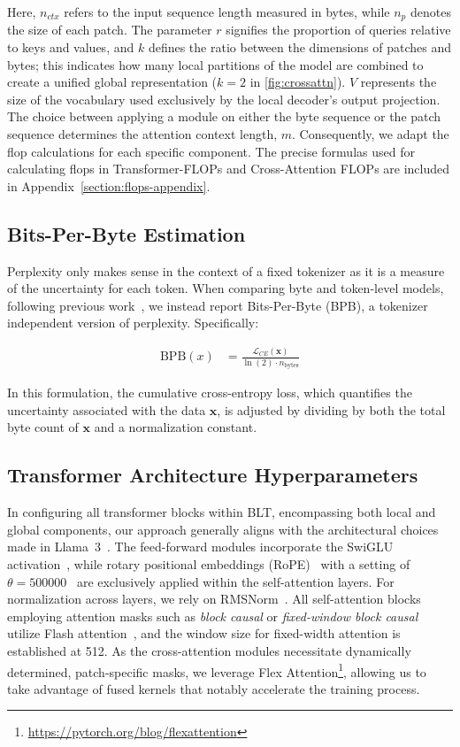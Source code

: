 Here, $n_{ctx}$ refers to the input sequence length measured in bytes, while $n_p$ denotes the size of each patch. The parameter $r$ signifies the proportion of queries relative to keys and values, and $k$ defines the ratio between the dimensions of patches and bytes; this indicates how many local partitions of the model are combined to create a unified global representation ($k=2$ in \autoref{fig:crossattn}). $V$ represents the size of the vocabulary used exclusively by the local decoder’s output projection. The choice between applying a module on either the byte sequence or the patch sequence determines the attention context length, $m$. Consequently, we adapt the flop calculations for each specific component. The precise formulas used for calculating flops in Transformer-FLOPs and Cross-Attention FLOPs are included in Appendix~\ref{section:flops-appendix}.

\subsection{Bits-Per-Byte Estimation} Perplexity only makes sense in the context of a fixed tokenizer as it is a measure of the uncertainty for each token. When comparing byte and token-level models, following previous work~\citep{xue2022byt5, yu2023megabyte, wang2024mambabyte}, we instead report Bits-Per-Byte (BPB), a tokenizer independent version of perplexity. Specifically:

\begin{align}
    \text{BPB}(x)&= \frac{\mathcal{L}_{CE}(\pmb{x})}{\ln(2)\cdot n_{\text{bytes}}}
\end{align}

In this formulation, the cumulative cross-entropy loss, which quantifies the uncertainty associated with the data $\pmb{x}$, is adjusted by dividing by both the total byte count of $\pmb{x}$ and a normalization constant.

\subsection{Transformer Architecture Hyperparameters} In configuring all transformer blocks within {\textsc BLT}, encompassing both local and global components, our approach generally aligns with the architectural choices made in Llama~3~\citep{dubey2024llama}. The feed-forward modules incorporate the SwiGLU activation~\citep{swiglu}, while rotary positional embeddings (RoPE)~\citep{RoPe} with a setting of $\theta=500000$~\citep{xiong2024effective} are exclusively applied within the self-attention layers. For normalization across layers, we rely on RMSNorm~\citep{RMSNorm}. All self-attention blocks employing attention masks such as \textit{block causal} or \textit{fixed-window block causal} utilize Flash attention~\citep{dao2022flashattention}, and the window size for fixed-width attention is established at 512. As the cross-attention modules necessitate dynamically determined, patch-specific masks, we leverage Flex Attention\footnote{\url{https://pytorch.org/blog/flexattention}}, allowing us to take advantage of fused kernels that notably accelerate the training process.

